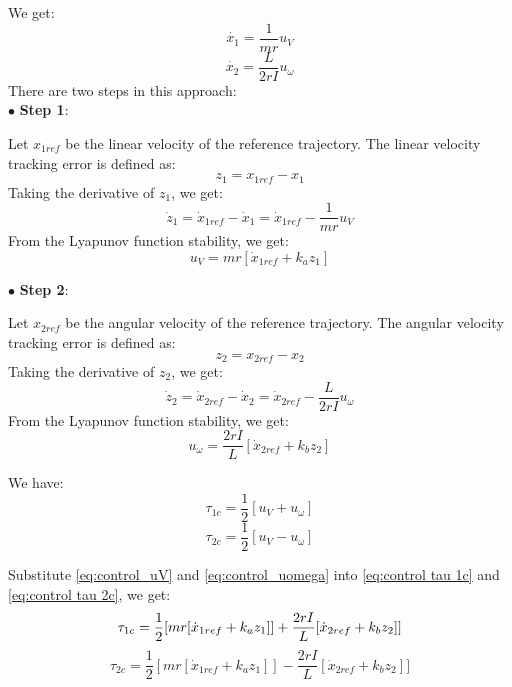 We get:
\begin{equation}
\Dot{x_1} = \frac{1}{mr}u_V
\end{equation}
\begin{equation}
\Dot{x_2} = \frac{L}{2rI}u_\omega
\end{equation}
There are two steps in this approach:\\
$\bullet$ \textbf{Step 1}:\par
Let \(x_{1ref}\) be the linear velocity of the reference trajectory. The linear velocity tracking error is defined as:
\begin{equation}
z_1 = x_{1ref} - x_1
\end{equation}
Taking the derivative of \(z_1\), we get: 
\begin{equation}
\Dot{z}_1 = \Dot{x}_{1ref}-\Dot{x}_1 = \Dot{x}_{1ref} - \frac{1}{mr} u_V
\end{equation}
From the Lyapunov function stability, we get:
\begin{equation} \label{eq:control_uV}
u_V = mr[\Dot{x}_{1ref} + k_az_1]
\end{equation}

\break
$\bullet$ \textbf{Step 2}:\par
Let \(x_{2ref}\) be the angular velocity of the reference trajectory. The angular velocity tracking error is defined as:
\begin{equation}
z_2 = x_{2ref} - x_2
\end{equation}
Taking the derivative of \(z_2\), we get:
\begin{equation}
\Dot{z}_2 = \Dot{x}_{2ref}-\Dot{x}_2 = \Dot{x}_{2ref} - \frac{L}{2rI} u_\omega
\end{equation}
From the Lyapunov function stability, we get:
\begin{equation} \label{eq:control_uomega}
u_\omega = \frac{2rI}{L}[\Dot{x}_{2ref} + k_bz_2]
\end{equation}

We have:
\begin{equation} \label{eq:control tau 1c}
\tau_{1c} = \frac{1}{2}[u_V+u_\omega]
\end{equation}
\begin{equation} \label{eq:control tau 2c}
\tau_{2c} = \frac{1}{2}[u_V-u_\omega]
\end{equation}

Substitute \ref{eq:control_uV} and \ref{eq:control_uomega} into \ref{eq:control tau 1c} and \ref{eq:control tau 2c}, we get:
\begin{equation}
\tau_{1c} = \frac{1}{2}[mr[\Dot{x}_{1ref} + k_az_1]]+\frac{2rI}{L}[\Dot{x}_{2ref} + k_bz_2]]\\
\end{equation}
\begin{equation}
\tau_{2c} = \frac{1}{2}[mr[\Dot{x}_{1ref} + k_az_1]]-\frac{2rI}{L}[\Dot{x}_{2ref} + k_bz_2]]
\end{equation}

